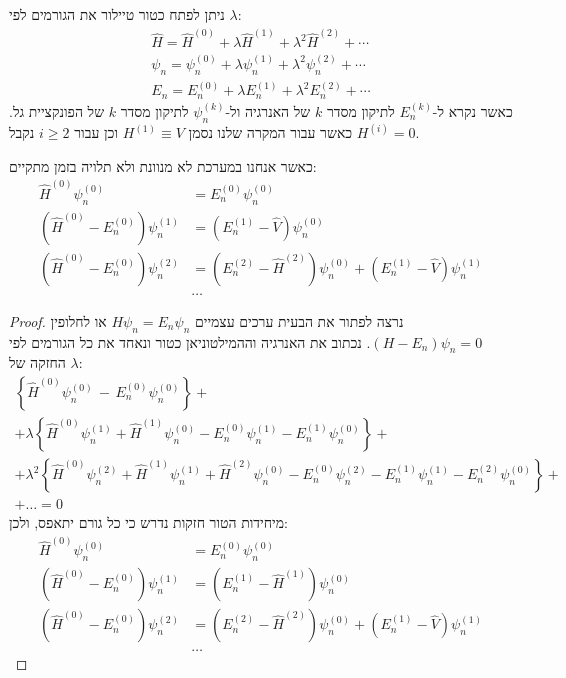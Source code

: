 \documentclass{tstextbook}
\begin{document}
\begin{symbolize}
ניתן לפתח כטור טיילור את הגורמים לפי \(\lambda\):
$$\begin{gather}{{\hat{H}}}={{\hat{H}^{(0)}+\lambda\hat{H}^{(1)}+\lambda^{2}\hat{H}^{(2)}+\cdots}}\\ {{\psi_{n}}}={{\psi_{n}^{(0)}+\lambda\psi_{n}^{(1)}+\lambda^{2}\psi_{n}^{(2)}+\cdots}}\\{{E_{n}}}={{E_{n}^{(0)}+\lambda E_{n}^{(1)}+\lambda^{2}E_{n}^{(2)}+\cdots}}
\end{gather}$$
כאשר נקרא ל-\(E_{n}^{(k)}\) לתיקון מסדר \(k\) של האנרגיה ול-\(\psi_{n}^{(k)}\) לתיקון מסדר \(k\) של הפונקציית גל. כאשר עבור המקרה שלנו נסמן \(H^{(1)} \equiv V\) וכן עבור \(i\geq 2\) נקבל \(H^{(i)}=0\).

\end{symbolize}
\begin{proposition}
כאשר אנחנו במערכת לא מנוונת ולא תלויה בזמן מתקיים:
$$\begin{aligned}\hat{H}^{(0)}\psi_{n}^{(0)} & =E_{n}^{(0)}\psi_{n}^{(0)} \\\left( \hat{H}^{(0)}-E_{n}^{(0)} \right)\psi_{n}^{(1)} & =\left( E_{n}^{(1)}-\hat{V} \right)\psi_{n}^{(0)} \\\left( \hat{H}^{(0)}-E_n^{(0)} \right)\psi_n^{(2)} & =\left( E_n^{(2)}-\hat{H}^{(2)} \right)\psi_n^{(0)}+\left( E_n^{(1)}-\hat{V} \right)\psi_n^{(1)}\\&\dots
\end{aligned}$$

\end{proposition}
\begin{proof}
נרצה לפתור את הבעית ערכים עצמיים \(H\psi_{n}=E_{n}\psi_{n}\) או לחלופין \((H-E_{n})\psi_{n}=0\).
נכתוב את האנרגיה וההמילטוניאן כטור ונאחד את כל הגורמים לפי החזקה של \(\lambda\):
$$\begin{gather}\left\{ \hat{H}^{(0)}\psi_{n}^{(0)}\,-\,E_{n}^{(0)}\psi_{n}^{(0)} \right\}+\\+\lambda\left\{ \hat{H}^{(0)}\psi_{n}^{(1)}+\hat{H}^{(1)}\psi_{n}^{(0)}-E_{n}^{(0)}\psi_{n}^{(1)}-E_{n}^{(1)}\psi_{n}^{(0)} \right\}+\\+\lambda^{2}\left\{ \hat{H}^{(0)}\psi_{n}^{(2)}+\hat{H}^{(1)}\psi_{n}^{(1)}+\hat{H}^{(2)}\psi_{n}^{(0)}-E_{n}^{(0)}\psi_{n}^{(2)}-E_{n}^{(1)}\psi_{n}^{(1)}-E_{n}^{(2)}\psi_{n}^{(0)} \right\}+\\+\dots = 0
\end{gather}$$
מיחידות הטור חזקות נדרש כי כל גורם יתאפס, ולכן:
$$\begin{aligned}\hat{H}^{(0)}\psi_{n}^{(0)} & =E_{n}^{(0)}\psi_{n}^{(0)} \\\left( \hat{H}^{(0)}-E_{n}^{(0)} \right)\psi_{n}^{(1)} & =\left( E_{n}^{(1)}-\hat{H}^{(1)} \right)\psi_{n}^{(0)} \\\left( \hat{H}^{(0)}-E_n^{(0)} \right)\psi_n^{(2)} & =\left( E_n^{(2)}-\hat{H}^{(2)} \right)\psi_n^{(0)}+\left( E_n^{(1)}-\hat{V} \right)\psi_n^{(1)}\\&\dots
\end{aligned}$$

\end{proof}
\end{document}
